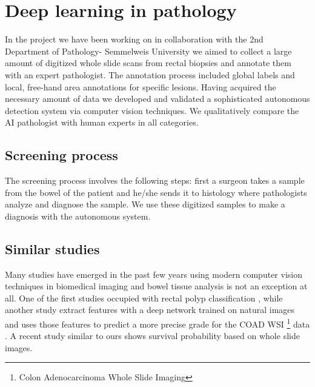 \documentclass[a4paper,12pt]{article}
\begin{document}
\newpage

\section{Deep learning in pathology}

\vspace{7mm}

\par In the project we have been working on in collaboration with the 2nd Department of Pathology- Semmelweis University we aimed to collect a large amount of digitized whole slide scans from rectal biopsies and annotate them with an expert pathologist. The annotation process included global labels and local, free-hand area annotations for specific lesions. Having acquired the necessary amount of data we developed and validated a sophisticated autonomous detection system via computer vision techniques. We qualitatively compare the AI pathologist with human experts in all categories.

\vspace{4mm}

\subsection{Screening process}

\vspace{4mm}

\par The screening process involves the following steps: first a surgeon takes a sample from the bowel of the patient and he/she sends it to histology where pathologists analyze and diagnose the sample. We use these digitized samples to make a diagnosis with the autonomous system.

\vspace{4mm}

\subsection{Similar studies}

\vspace{4mm}

\par Many studies have emerged in the past few years using modern computer vision techniques in biomedical imaging and bowel tissue analysis is not an exception at all. One of the first studies occupied with rectal polyp classification \cite{korbar2017deep}, while another study extract features with a deep network trained on natural images and uses those features to predict a more precise grade for the COAD WSI \footnote{Colon Adenocarcinoma Whole Slide Imaging} data \cite{bychkov2018deep}. A recent study similar to ours shows \cite{skrede2020deep} survival probability based on whole slide images.
\end{document}
